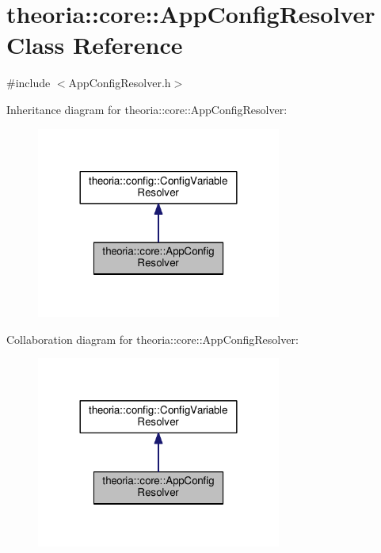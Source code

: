 \hypertarget{classtheoria_1_1core_1_1AppConfigResolver}{}\section{theoria\+:\+:core\+:\+:App\+Config\+Resolver Class Reference}
\label{classtheoria_1_1core_1_1AppConfigResolver}


{\ttfamily \#include $<$App\+Config\+Resolver.\+h$>$}



Inheritance diagram for theoria\+:\+:core\+:\+:App\+Config\+Resolver\+:\nopagebreak
\begin{figure}[H]
\begin{center}
\leavevmode
\includegraphics[width=228pt]{classtheoria_1_1core_1_1AppConfigResolver__inherit__graph}
\end{center}
\end{figure}


Collaboration diagram for theoria\+:\+:core\+:\+:App\+Config\+Resolver\+:\nopagebreak
\begin{figure}[H]
\begin{center}
\leavevmode
\includegraphics[width=228pt]{classtheoria_1_1core_1_1AppConfigResolver__coll__graph}
\end{center}
\end{figure}
